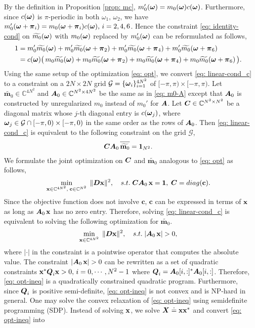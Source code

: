 By the definition in Proposition \ref{prop: mc}, $m_0'(\boldsymbol{\omega}) = m_0(\boldsymbol{\omega})c(\boldsymbol{\omega})$. Furthermore, since $c(\boldsymbol{\omega})$ is $\pi$-periodic in both $\omega_1,\,\omega_2$, we have $m_0'(\boldsymbol{\omega}+\boldsymbol{\pi}_i) = m_0(\boldsymbol{\omega}+\boldsymbol{\pi}_i)c(\boldsymbol{\omega}),\, i = 2,4,6$. Hence the constraint \eqref{eq: identity-cond} on $\widetilde{m_{0}}(\boldsymbol{\omega})$ with $m_0(\boldsymbol{\omega})$ replaced by $m_0'(\boldsymbol{\omega})$ can be reformulated as follows,
\begin{align}
1 & = m_0'\widetilde{m_{0}}(\boldsymbol{\omega}) + m_0'\widetilde{m_{0}}(\boldsymbol{\omega}+\boldsymbol{\pi}_{2}) + m_0'\widetilde{m_{0}}(\boldsymbol{\omega}+\boldsymbol{\pi}_{4}) + m_0'\widetilde{m_{0}}(\boldsymbol{\omega}+\boldsymbol{\pi}_{6})\notag\\
& = c(\boldsymbol{\omega})\big(\,m_0\widetilde{m_{0}}(\boldsymbol{\omega}) + m_0\widetilde{m_{0}}(\boldsymbol{\omega}+\boldsymbol{\pi}_{2}) + m_0\widetilde{m_{0}}(\boldsymbol{\omega}+\boldsymbol{\pi}_{4}) + m_0\widetilde{m_{0}}(\boldsymbol{\omega}+\boldsymbol{\pi}_{6})\,\big).\label{eq: linear-cond_c}
\end{align}
Using the same setup of the optimization \eqref{eq: opt}, we convert \eqref{eq: linear-cond_c} to a constraint on a $2N\times 2N$ grid $\mathcal{G}=\{\boldsymbol{\omega}_i\}_{i=1}^{4N^2}$ of $[-\pi,\pi)\times[-\pi,\pi)$.
Let $\widetilde{\mathbf{m}_0}\in\mathbb{C}^{4N^2}$ and $\boldsymbol{A}_0\in\mathbb{C}^{N^2\times 4N^2}$ be the same as in \eqref{eq: m0-A} except that $\boldsymbol{A}_0$ is constructed by unregularized $m_0$ instead of $m_0'$ for $\boldsymbol{A}$.
Let $\boldsymbol{C}\in\mathbb{C}^{N^2\times N^2}$ be a diagonal matrix whose $j$-th diagonal entry is $c(\boldsymbol{\omega}_j)$, where $\boldsymbol{\omega}_j\in \mathcal{G}\cap [-\pi,0)\times[-\pi,0)$ in the same order as the rows of $\boldsymbol{A}_0$. Then \eqref{eq: linear-cond_c} is equivalent to the following constraint on the grid $\mathcal{G}$,
\begin{align}
\V{C}\V{A}_0\,\overlinespace{\widetilde{\mathbf{m}_0}} = \V{1}_{N^2}.
\end{align}
We formulate the joint optimization on $\boldsymbol{C}$ and $\widetilde{\mathbf{m}_0}$ analogous to \eqref{eq: opt} as follows,
\begin{align}\label{eq: opt-C}
\min_{\mathbf{x}\in\mathbb{C}^{4N^2},\;\mathbf{c}\in\mathbb{C}^{N^2}}\; \Vert \boldsymbol{D}\mathbf{x}\Vert^2,\quad 
s.t. \; \boldsymbol{C}\boldsymbol{A}_0\,\mathbf{x} = \mathbf{1}, \; \boldsymbol{C} = diag(\mathbf{c}).
\end{align}
Since the objective function does not involve $\mathbf{c}$, $\mathbf{c}$ can be expressed in terms of $\mathbf{x}$ as long as $\boldsymbol{A}_0\,\mathbf{x}$ has no zero entry. Therefore, solving \eqref{eq: linear-cond_c} is equivalent to solving the following optimization for $\widetilde{\mathbf{m}_0}$.
\begin{align}\label{eq: opt-ineq}
\min_{\mathbf{x}\in\mathbb{C}^{4N^2}}\; \Vert \boldsymbol{D}\mathbf{x}\Vert^2,\quad 
s.t. \; |\boldsymbol{A}_0\,\mathbf{x}| > 0,
\end{align}
where $|\cdot|$ in the constraint is a pointwise operator that computes the absolute value. The constraint $|\boldsymbol{A}_0\,\mathbf{x}| > 0$ can be rewritten as a set of quadratic constraints $\mathbf{x}^*\boldsymbol{Q}_i\mathbf{x} > 0,\, i =0,\cdots, N^2-1 $ where $\boldsymbol{Q}_i = \boldsymbol{A}_0[i,:]^*\boldsymbol{A}_0[i,:]$. Therefore, \eqref{eq: opt-ineq} is a quadratically constrained quadratic program. Furthermore, since $\boldsymbol{Q}_i$ is positive semi-definite, \eqref{eq: opt-ineq} is not convex and is NP-hard in general. One may solve the convex relaxation of \eqref{eq: opt-ineq} using semidefinite programming (SDP). Instead of solving $\mathbf{x}$, we solve $\boldsymbol{X}\doteq \mathbf{x}\mathbf{x}^*$ and convert \eqref{eq: opt-ineq} into 

